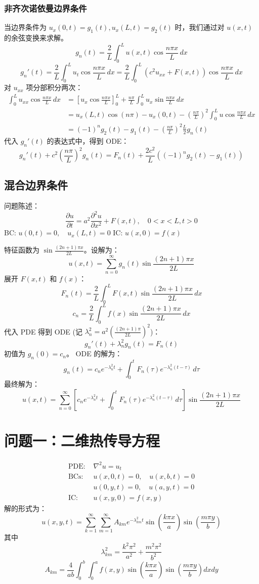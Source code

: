 \documentclass{article}
\begin{document}
	\subsubsection{非齐次诺依曼边界条件}
	当边界条件为 $u_x(0,t) = g_1(t), u_x(L,t) = g_2(t)$ 时，我们通过对 $u(x,t)$ 的余弦变换来求解。
	$$ g_n(t) = \frac{2}{L} \int_0^L u(x,t) \cos\frac{n\pi x}{L} \,dx $$
	$$ g_n'(t) = \frac{2}{L} \int_0^L u_t \cos\frac{n\pi x}{L} \,dx = \frac{2}{L} \int_0^L (c^2 u_{xx} + F(x,t)) \cos\frac{n\pi x}{L} \,dx $$
	对 $u_{xx}$ 项分部积分两次：
	\begin{align*}
		\int_0^L u_{xx} \cos\frac{n\pi x}{L} \,dx &= \left[ u_x \cos\frac{n\pi x}{L} \right]_0^L + \frac{n\pi}{L} \int_0^L u_x \sin\frac{n\pi x}{L} \,dx \\
		&= u_x(L,t)\cos(n\pi) - u_x(0,t) - \left(\frac{n\pi}{L}\right)^2 \int_0^L u \cos\frac{n\pi x}{L} \,dx \\
		&= (-1)^n g_2(t) - g_1(t) - \left(\frac{n\pi}{L}\right)^2 \frac{L}{2} g_n(t)
	\end{align*}
	代入 $g_n'(t)$ 的表达式中，得到 ODE：
	$$ g_n'(t) + c^2\left(\frac{n\pi}{L}\right)^2 g_n(t) = F_n(t) + \frac{2c^2}{L} ((-1)^n g_2(t) - g_1(t)) $$
	
	\subsection{混合边界条件}
	问题陈述：
	$$ \frac{\partial u}{\partial t} = a^2 \frac{\partial^2 u}{\partial x^2} + F(x,t), \quad 0 < x < L, t > 0 $$
	BC: $u(0,t) = 0, \quad u_x(L,t) = 0$
	IC: $u(x,0) = f(x)$
	
	特征函数为 $\sin\frac{(2n+1)\pi x}{2L}$。设解为：
	$$ u(x,t) = \sum_{n=0}^{\infty} g_n(t) \sin\frac{(2n+1)\pi x}{2L} $$
	展开 $F(x,t)$ 和 $f(x)$：
	$$ F_n(t) = \frac{2}{L} \int_0^L F(x,t)\sin\frac{(2n+1)\pi x}{2L} \,dx $$
	$$ c_n = \frac{2}{L} \int_0^L f(x)\sin\frac{(2n+1)\pi x}{2L} \,dx $$
	代入 PDE 得到 ODE (记 $\lambda_n^2 = a^2(\frac{(2n+1)\pi}{2L})^2$)：
	$$ g_n'(t) + \lambda_n^2 g_n(t) = F_n(t) $$
	初值为 $g_n(0) = c_n$。
	ODE 的解为：
	$$ g_n(t) = c_n e^{-\lambda_n^2 t} + \int_0^t F_n(\tau) e^{-\lambda_n^2(t-\tau)} \,d\tau $$
	最终解为：
	$$ u(x,t) = \sum_{n=0}^{\infty} \left[ c_n e^{-\lambda_n^2 t} + \int_0^t F_n(\tau) e^{-\lambda_n^2(t-\tau)} \,d\tau \right] \sin\frac{(2n+1)\pi x}{2L} $$
	\section*{问题一：二维热传导方程}
	\begin{align*}
		\text{PDE: } & \nabla^2 u = u_t \\
		\text{BCs: } & u(x,0,t) = 0, \quad u(x,b,t) = 0 \\
		& u(0,y,t) = 0, \quad u(a,y,t) = 0 \\
		\text{IC: }  & u(x,y,0) = f(x,y)
	\end{align*}
	解的形式为：
	$$
	u(x,y,t) = \sum_{k=1}^{\infty} \sum_{m=1}^{\infty} A_{km} e^{-\lambda_{km}^2 t} \sin\left(\frac{k\pi x}{a}\right) \sin\left(\frac{m\pi y}{b}\right)
	$$
	其中
	$$
	\lambda_{km}^2 = \frac{k^2\pi^2}{a^2} + \frac{m^2\pi^2}{b^2}
	$$
	$$
	A_{km} = \frac{4}{ab} \int_0^b \int_0^a f(x,y) \sin\left(\frac{k\pi x}{a}\right) \sin\left(\frac{m\pi y}{b}\right) dx dy
	$$
	
\end{document}
